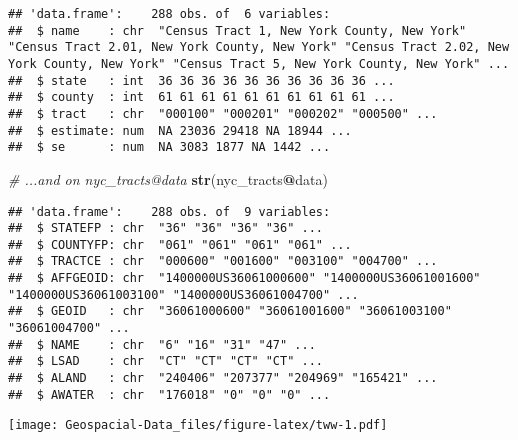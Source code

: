 \documentclass[]{article}
\newenvironment{Shaded}{\begin{snugshade}}{\end{snugshade}}
\newcommand{\CommentTok}[1]{\textcolor[rgb]{0.56,0.35,0.01}{\textit{#1}}}
\newcommand{\DataTypeTok}[1]{\textcolor[rgb]{0.13,0.29,0.53}{#1}}
\newcommand{\KeywordTok}[1]{\textcolor[rgb]{0.13,0.29,0.53}{\textbf{#1}}}
\newcommand{\NormalTok}[1]{#1}
\newcommand{\OperatorTok}[1]{\textcolor[rgb]{0.81,0.36,0.00}{\textbf{#1}}}
\newcommand{\OtherTok}[1]{\textcolor[rgb]{0.56,0.35,0.01}{#1}}
\newcommand{\StringTok}[1]{\textcolor[rgb]{0.31,0.60,0.02}{#1}}
\begin{document}
\begin{verbatim}
## 'data.frame':    288 obs. of  6 variables:
##  $ name    : chr  "Census Tract 1, New York County, New York" "Census Tract 2.01, New York County, New York" "Census Tract 2.02, New York County, New York" "Census Tract 5, New York County, New York" ...
##  $ state   : int  36 36 36 36 36 36 36 36 36 36 ...
##  $ county  : int  61 61 61 61 61 61 61 61 61 61 ...
##  $ tract   : chr  "000100" "000201" "000202" "000500" ...
##  $ estimate: num  NA 23036 29418 NA 18944 ...
##  $ se      : num  NA 3083 1877 NA 1442 ...
\end{verbatim}

\begin{Shaded}
\begin{Highlighting}[]
\CommentTok{# ...and on nyc_tracts@data}
\KeywordTok{str}\NormalTok{(nyc_tracts}\OperatorTok{@}\NormalTok{data)}
\end{Highlighting}
\end{Shaded}

\begin{verbatim}
## 'data.frame':    288 obs. of  9 variables:
##  $ STATEFP : chr  "36" "36" "36" "36" ...
##  $ COUNTYFP: chr  "061" "061" "061" "061" ...
##  $ TRACTCE : chr  "000600" "001600" "003100" "004700" ...
##  $ AFFGEOID: chr  "1400000US36061000600" "1400000US36061001600" "1400000US36061003100" "1400000US36061004700" ...
##  $ GEOID   : chr  "36061000600" "36061001600" "36061003100" "36061004700" ...
##  $ NAME    : chr  "6" "16" "31" "47" ...
##  $ LSAD    : chr  "CT" "CT" "CT" "CT" ...
##  $ ALAND   : chr  "240406" "207377" "204969" "165421" ...
##  $ AWATER  : chr  "176018" "0" "0" "0" ...
\end{verbatim}

\begin{Shaded}
\end{Shaded}

\texttt{[image: Geospacial-Data\_files/figure-latex/tww-1.pdf]}

\begin{Shaded}
\end{Shaded}
\end{document}

